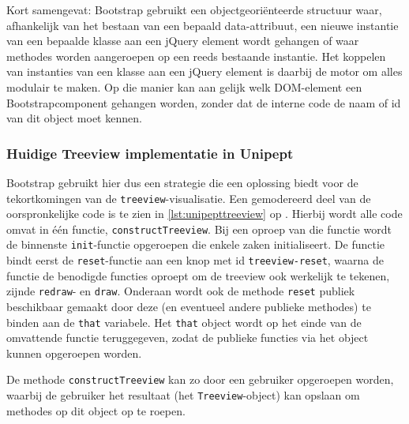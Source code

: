Kort samengevat: Bootstrap gebruikt een objectgeoriënteerde structuur waar,
afhankelijk van het bestaan van een bepaald data-attribuut, een nieuwe instantie
van een bepaalde klasse aan een jQuery element wordt gehangen of waar methodes
worden aangeroepen op een reeds bestaande instantie. Het koppelen van instanties
van een klasse aan een jQuery element is daarbij de motor om alles modulair te
maken. Op die manier kan aan gelijk welk DOM-element een Bootstrapcomponent
gehangen worden, zonder dat de interne code de naam of id van dit object moet
kennen.

\subsubsection{Huidige Treeview implementatie in Unipept}

Bootstrap gebruikt hier dus een strategie die een oplossing biedt voor de
tekortkomingen van de \texttt{treeview}-visualisatie. Een gemodereerd deel van
de oorspronkelijke code is te zien in \autoref{lst:unipepttreeview} op
. Hierbij wordt alle code omvat in één functie,
\texttt{constructTreeview}. Bij een oproep van die functie wordt de binnenste
\texttt{init}-functie opgeroepen die enkele zaken initialiseert. De functie
bindt eerst de \texttt{reset}-functie aan een knop met id
\texttt{treeview-reset}, waarna de functie de benodigde functies oproept om de
treeview ook werkelijk te tekenen, zijnde \texttt{redraw}- en \texttt{draw}.
Onderaan wordt ook de methode \texttt{reset} publiek beschikbaar gemaakt door
deze (en eventueel andere publieke methodes) te binden aan de \texttt{that}
variabele. Het \texttt{that} object wordt op het einde van de omvattende functie
teruggegeven, zodat de publieke functies via het object kunnen opgeroepen
worden.

De methode \texttt{constructTreeview} kan zo door een gebruiker opgeroepen
worden, waarbij de gebruiker het resultaat (het \texttt{Treeview}-object) kan
opslaan om methodes op dit object op te roepen.

